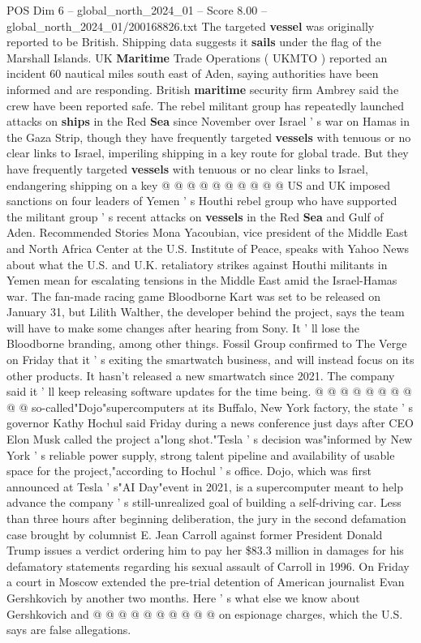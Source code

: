 \begin{textsample}{POS Dim 6 – global\_north\_2024\_01 – Score 8.00 – global\_north\_2024\_01/200168826.txt}
The targeted \textbf{vessel} was originally reported to be British.
Shipping data suggests it \textbf{sails} under the flag of the Marshall Islands.
UK \textbf{Maritime} Trade Operations ( UKMTO ) reported an incident 60 nautical miles south east of Aden, saying authorities have been informed and are responding.
British \textbf{maritime} security firm Ambrey said the crew have been reported safe.
The rebel militant group has repeatedly launched attacks on \textbf{ships} in the Red \textbf{Sea} since November over Israel ' s war on Hamas in the Gaza Strip, though they have frequently targeted \textbf{vessels} with tenuous or no clear links to Israel, imperiling shipping in a key route for global trade.
But they have frequently targeted \textbf{vessels} with tenuous or no clear links to Israel, endangering shipping on a key @ @ @ @ @ @ @ @ @ @ US and UK imposed sanctions on four leaders of Yemen ' s Houthi rebel group who have supported the militant group ' s recent attacks on \textbf{vessels} in the Red \textbf{Sea} and Gulf of Aden.
Recommended Stories Mona Yacoubian, vice president of the Middle East and North Africa Center at the U.S.
Institute of Peace, speaks with Yahoo News about what the U.S. and U.K. retaliatory strikes against Houthi militants in Yemen mean for escalating tensions in the Middle East amid the Israel-Hamas war.
The fan-made racing game Bloodborne Kart was set to be released on January 31, but Lilith Walther, the developer behind the project, says the team will have to make some changes after hearing from Sony.
It ' ll lose the Bloodborne branding, among other things.
Fossil Group confirmed to The Verge on Friday that it ' s exiting the smartwatch business, and will instead focus on its other products.
It hasn't released a new smartwatch since 2021.
The company said it ' ll keep releasing software updates for the time being. @ @ @ @ @ @ @ @ @ @ so-called"Dojo"supercomputers at its Buffalo, New York factory, the state ' s governor Kathy Hochul said Friday during a news conference just days after CEO Elon Musk called the project a"long shot."Tesla ' s decision was"informed by New York ' s reliable power supply, strong talent pipeline and availability of usable space for the project,"according to Hochul ' s office.
Dojo, which was first announced at Tesla ' s"AI Day"event in 2021, is a supercomputer meant to help advance the company ' s still-unrealized goal of building a self-driving car.
Less than three hours after beginning deliberation, the jury in the second defamation case brought by columnist E.
Jean Carroll against former President Donald Trump issues a verdict ordering him to pay her \$83.3 million in damages for his defamatory statements regarding his sexual assault of Carroll in 1996.
On Friday a court in Moscow extended the pre-trial detention of American journalist Evan Gershkovich by another two months.
Here ' s what else we know about Gershkovich and @ @ @ @ @ @ @ @ @ @ on espionage charges, which the U.S. says are false allegations.

\end{textsample}
